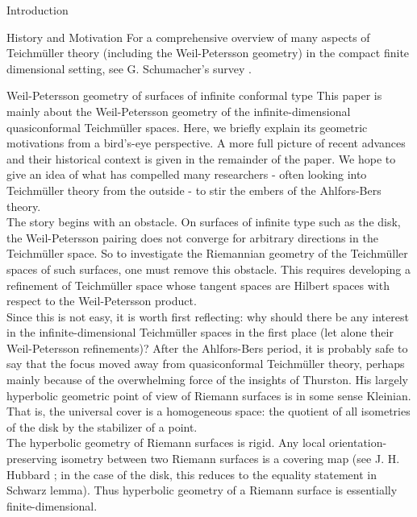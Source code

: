 \documentclass[12pt]{amsart}
\theoremstyle{plain}
\theoremstyle{definition}
\theoremstyle{remark}
\numberwithin{equation}{section} %
\numberwithin{figure}{section} %
\begin{document}
\begin{section}{Introduction}
\begin{subsection}{History and Motivation}
{For a comprehensive overview of many aspects of Teichm\"uller theory (including the Weil-Petersson geometry) in the compact finite dimensional setting, see G. Schumacher's survey \cite{Schumachersurvey}}.
\end{subsection}
\begin{subsection}{Weil-Petersson geometry of surfaces of infinite conformal type} 
This paper is mainly about the Weil-Petersson geometry of the infinite-dimensional quasiconformal Teichm\"uller spaces. Here, we briefly explain its geometric motivations from a bird's-eye perspective. A more full picture of recent advances and their historical context is given in the remainder of the paper. We hope to give an idea of what has compelled many researchers - often looking into Teichm\"uller theory from the outside - to stir the embers of the Ahlfors-Bers theory.\\  

The story begins with an obstacle.
{On surfaces of infinite type such as the disk, the Weil-Petersson pairing does not converge for arbitrary directions in the Teichm\"uller space. So to investigate the Riemannian geometry of the Teichm\"uller spaces of such surfaces, one must remove this obstacle. This requires developing a refinement of Teichm\"uller space whose tangent spaces are Hilbert spaces with respect to the Weil-Petersson product. }\\

Since this is not easy, it is worth first reflecting: why should there be any interest in the infinite-dimensional Teichm\"uller spaces in the first place (let alone their Weil-Petersson refinements)?  After the Ahlfors-Bers period, it is probably safe to say that the focus moved away from quasiconformal Teichm\"uller theory, perhaps mainly because of the overwhelming force of the insights of Thurston. His largely hyperbolic geometric point of view of Riemann surfaces is in some sense Kleinian. That is, the universal cover is a homogeneous space: the quotient of all isometries of the disk by the stabilizer of a point.\\ 

The hyperbolic geometry of Riemann surfaces is rigid. Any local orientation-preserving isometry between two Riemann surfaces is a covering map (see J. H. Hubbard \cite[Proposition 3.3.4]{Hubbard_Book}; in the case of the disk, this reduces to the equality statement in Schwarz lemma). Thus hyperbolic geometry of a Riemann surface is essentially finite-dimensional. 


\end{subsection}
\end{section}
\end{document}
